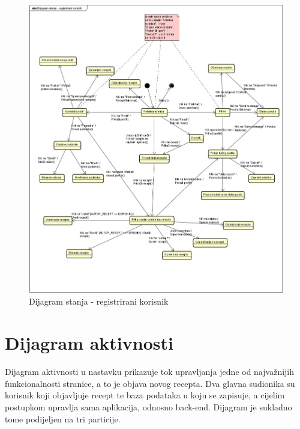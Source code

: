 			\begin{figure}[H]
				\includegraphics[scale=0.5]{slike/dijagram_stanja.jpeg} %
				\centering
				\caption{Dijagram stanja - registrirani korisnik}
				\label{fig:Dijagram_stanja}
			\end{figure}
			
			\eject 
		
		\section{Dijagram aktivnosti}
			
			
			 Dijagram aktivnosti u nastavku prikazuje tok upravljanja jedne od najvažnijih funkcionalnosti stranice, a to je objava novog recepta. Dva glavna sudionika su korisnik koji objavljuje recept te baza podataka u koju se zapisuje, a cijelim postupkom upravlja sama aplikacija, odnosno back-end. Dijagram je sukladno tome podijeljen na tri particije.
			 
